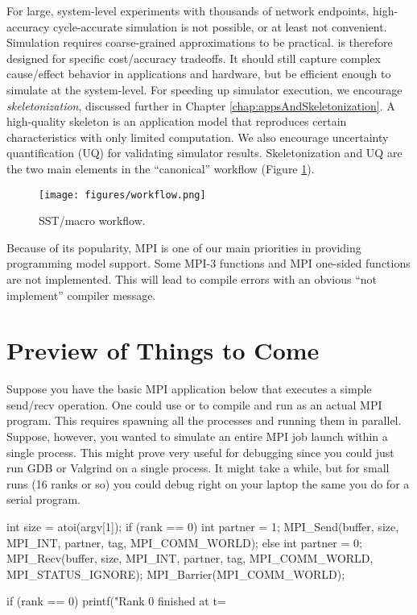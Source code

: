 For large, system-level experiments with thousands of network endpoints, high-accuracy cycle-accurate simulation is not possible,
or at least not convenient.
Simulation requires coarse-grained approximations to be practical.
\sstmacro is therefore designed for specific cost/accuracy tradeoffs.
It should still capture complex cause/effect behavior in applications and hardware, but be efficient enough to simulate at the system-level. 
For speeding up simulator execution, we encourage \textit{skeletonization}, discussed further in Chapter \ref{chap:appsAndSkeletonization}. 
A high-quality skeleton is an application model that reproduces certain characteristics with only limited computation.  
We also encourage uncertainty quantification (UQ) for validating simulator results.
Skeletonization and UQ are the two main elements in the ``canonical'' \sstmacro workflow (Figure \ref{fig:workflow}).

\begin{figure}[t]
  \centering
    \texttt{[image: figures/workflow.png]}
      \caption{SST/macro workflow.}
      \label{fig:workflow}
\end{figure}

Because of its popularity, MPI is one of our main priorities in providing programming model support.  
Some MPI-3 functions and MPI one-sided functions are not implemented.
This will lead to compile errors with an obvious ``not implement'' compiler message.

\section{Preview of Things to Come}
Suppose you have the basic MPI application below that executes a simple send/recv operation.
One could use  or  to compile and run as an actual MPI program.
This requires spawning all the processes and running them in parallel.
Suppose, however, you wanted to simulate an entire MPI job launch within a single process.
This might prove very useful for debugging since you could just run GDB or Valgrind on a single process.
It might take a while, but for small runs (16 ranks or so) you could debug right on your laptop the same you do for a serial program.

\begin{CppCode}
int size = atoi(argv[1]);
if (rank == 0){
 int partner = 1;
  MPI_Send(buffer, size, MPI_INT, partner, tag, MPI_COMM_WORLD);
} else {
  int partner = 0;
  MPI_Recv(buffer, size, MPI_INT, partner, tag, MPI_COMM_WORLD, MPI_STATUS_IGNORE);
}
MPI_Barrier(MPI_COMM_WORLD);

if (rank == 0){
  printf("Rank 0 finished at t=%
}
\end{CppCode}

